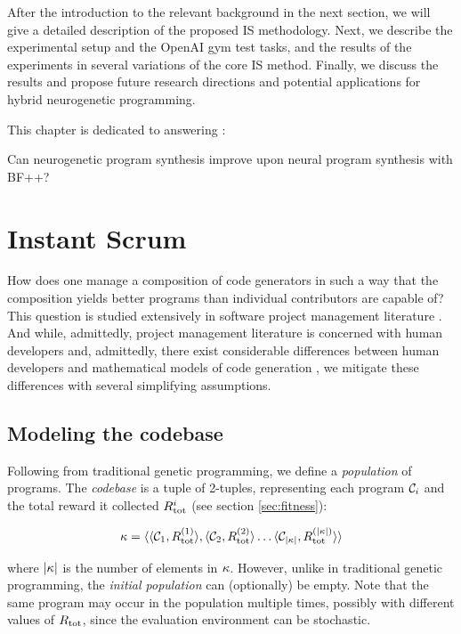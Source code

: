 After the introduction to the relevant background in the next section, we will give a detailed description of the proposed IS methodology. Next, we describe the experimental setup and the OpenAI gym test tasks, and the results of the experiments in several variations of the core IS method. Finally, we discuss the results and propose future research directions and potential applications for hybrid neurogenetic programming. 

This chapter is dedicated to answering \rqneurogen:

\begin{highlight}
    Can neurogenetic program synthesis improve upon neural program synthesis with BF++?
\end{highlight}

\newpage
\section{Instant Scrum}

How does one manage a composition of code generators in such a way that the composition yields better programs than individual contributors are capable of? 
This question is studied extensively in software project management literature \cite{mythicalmanmonth}.
And while, admittedly, project management literature is concerned with human developers and, admittedly, there exist considerable differences between human developers and mathematical models of code generation \cite{bugfixing}, we mitigate these differences with several simplifying assumptions.

\subsection{Modeling the codebase}

Following from traditional genetic programming, we define a \emph{population} of programs. 
The \emph{codebase} is a tuple of 2-tuples, representing each program $\mathcal{C}_i$ and the total reward it collected $R_\text{tot}^i$ (see section \ref{sec:fitness}):

\begin{equation}
    \kappa = \langle \langle \mathcal{C}_1, R_\text{tot}^{(1)} \rangle, \langle \mathcal{C}_2, R_\text{tot}^{(2)} \rangle \dots \langle \mathcal{C}_{|\kappa|}, R_\text{tot}^{(|\kappa|)} \rangle \rangle
\end{equation}

where $|\kappa|$ is the number of elements in $\kappa$.
However, unlike in traditional genetic programming, the \emph{initial population} can (optionally) be empty.
Note that the same program may occur in the population multiple times, possibly with different values of $R_\text{tot}$, since the evaluation environment can be stochastic.

